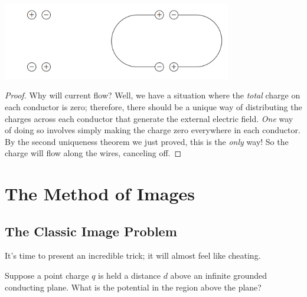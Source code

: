 \begin{center}
    \includegraphics[width=10cm]{Electrodynamics/images/fig3.7-8.PNG}
\end{center}

\begin{proof}
Why will current flow? Well, we have a situation where the \textit{total} charge on each conductor is zero; therefore, there should be a unique way of distributing the charges across each conductor that generate the external electric field. \textit{One} way of doing so involves simply making the charge zero everywhere in each conductor. By the second uniqueness theorem we just proved, this is the \textit{only} way! So the charge will flow along the wires, canceling off.
\end{proof}

\section{The Method of Images}

\subsection{The Classic Image Problem}

It's time to present an incredible trick; it will almost feel like cheating.

\begin{example}
Suppose a point charge $q$ is held a distance $d$ above an infinite grounded conducting plane. What is the potential in the region above the plane?
\end{example}

